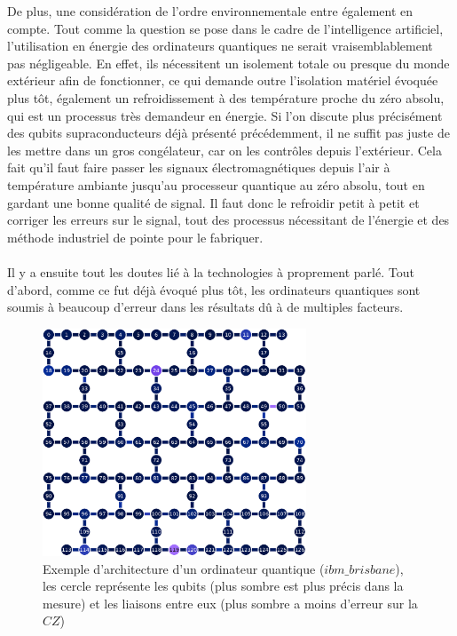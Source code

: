 \documentclass[11pt, a4paper]{report}
\begin{document}
De plus, une considération de l'ordre environnementale entre également en compte. Tout comme la question se pose dans le cadre de l'intelligence artificiel, l'utilisation en énergie des ordinateurs quantiques ne serait vraisemblablement pas négligeable. En effet, ils nécessitent un isolement totale ou presque du monde extérieur afin de fonctionner, ce qui demande outre l'isolation matériel évoquée plus tôt, également un refroidissement à des température proche du zéro absolu, qui est un processus très demandeur en énergie. Si l'on discute plus précisément des qubits supraconducteurs déjà présenté précédemment, il ne suffit pas juste de les mettre dans un gros congélateur, car on les contrôles depuis l'extérieur. Cela fait qu'il faut faire passer les signaux électromagnétiques depuis l'air à température ambiante jusqu'au processeur quantique au zéro absolu, tout en gardant une bonne qualité de signal. Il faut donc le refroidir petit à petit et corriger les erreurs sur le signal, tout des processus nécessitant de l'énergie et des méthode industriel de pointe pour le fabriquer.\\ \\
Il y a ensuite tout les doutes lié à la technologies à proprement parlé. Tout d'abord, comme ce fut déjà évoqué plus tôt, les ordinateurs quantiques sont soumis à beaucoup d'erreur dans les résultats dû à de multiples facteurs.

\begin{figure}[H]
\centering
\includegraphics[width=0.7\textwidth]{ibm_brisbane_example.eps}
\caption{Exemple d'architecture d'un ordinateur quantique ($ibm\_brisbane$), les cercle représente les qubits (plus sombre est plus précis dans la mesure) et les liaisons entre eux (plus sombre a moins d'erreur sur la $CZ$)}
\label{fig:arch-qc}
\end{figure}
\end{document}
